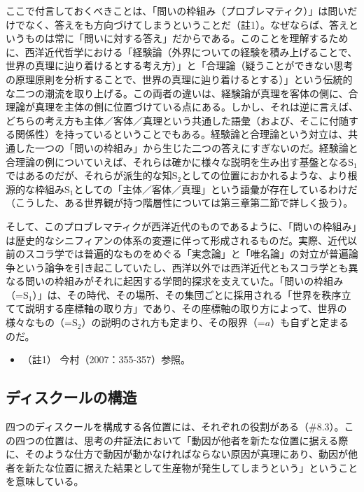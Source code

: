 ここで付言しておくべきことは、「問いの枠組み（プロブレマティク）」は問いだけでなく、答えをも方向づけてしまうということだ（註1）。なぜならば、答えというものは常に「問いに対する答え」だからである。このことを理解するために、西洋近代哲学における「経験論（外界についての経験を積み上げることで、世界の真理に辿り着けるとする考え方）」と「合理論（疑うことができない思考の原理原則を分析することで、世界の真理に辿り着けるとする）」という伝統的な二つの潮流を取り上げる。この両者の違いは、経験論が真理を客体の側に、合理論が真理を主体の側に位置づけている点にある。しかし、それは逆に言えば、どちらの考え方も主体／客体／真理という共通した語彙（および、そこに付随する関係性）を持っているということでもある。経験論と合理論という対立は、共通した一つの「問いの枠組み」から生じた二つの答えにすぎないのだ。経験論と合理論の例についていえば、それらは確かに様々な説明を生み出す基盤となる\(\textrm{S}_1\)ではあるのだが、それらが派生的な知\(\textrm{S}_2\)としての位置におかれるような、より根源的な枠組み\(\textrm{S}_1\)としての「主体／客体／真理」という語彙が存在しているわけだ（こうした、ある世界観が持つ階層性については第三章第二節で詳しく扱う）。

そして、このプロブレマティクが西洋近代のものであるように、「問いの枠組み」は歴史的なシニフィアンの体系の変遷に伴って形成されるものだ。実際、近代以前のスコラ学では普遍的なものをめぐる「実念論」と「唯名論」の対立が普遍論争という論争を引き起こしていたし、西洋以外では西洋近代ともスコラ学とも異なる問いの枠組みがそれに起因する学問的探求を支えていた。「問いの枠組み（=\(\textrm{S}_1\)）」は、その時代、その場所、その集団ごとに採用される「世界を秩序立てて説明する座標軸の取り方」であり、その座標軸の取り方によって、世界の様々なもの（=\(\textrm{S}_2\)）の説明のされ方も定まり、その限界（=\(a\)）も自ずと定まるのだ。

\begin{itemize}
\tightlist
\item
  （註1） 今村（2007：355-357）\cite{Imamura1}参照。
\end{itemize}

\subsection{ディスクールの構造}\label{ux30c7ux30a3ux30b9ux30afux30fcux30ebux306eux69cbux9020}

四つのディスクールを構成する各位置には、それぞれの役割がある（\#8.3）。この四つの位置は、思考の弁証法において「動因が他者を新たな位置に据える際に、そのような仕方で動因が動かなければならない原因が真理にあり、動因が他者を新たな位置に据えた結果として生産物が発生してしまうという」ということを意味している。

